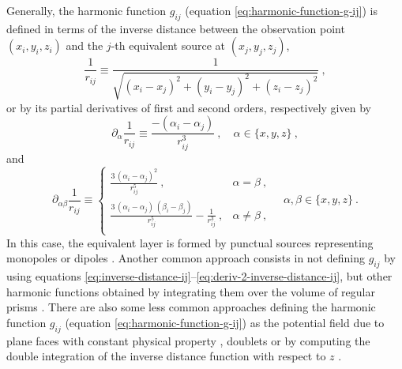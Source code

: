 Generally, the harmonic function $g_{ij}$ (equation \ref{eq:harmonic-function-g-ij}) is defined in terms of the 
inverse distance between the observation point $(x_{i}, y_{i}, z_{i})$ and the $j$-th equivalent source at $(x_{j}, y_{j}, z_{j})$,
\begin{equation}
	\frac{1}{r_{ij}} \equiv \frac{1}{\sqrt{(x_{i} - x_{j})^{2} + (y_{i} - y_{j})^{2} + (z_{i} - z_{j})^{2}}} \: ,
	\label{eq:inverse-distance-ij}
\end{equation}
or by its partial derivatives of first and second orders, respectively given by
\begin{equation}
	\partial_{\alpha} \frac{1}{r_{ij}} \equiv \frac{-(\alpha_{i} - \alpha_{j})}{r_{ij}^{3}} \: ,
	\quad \alpha \in \{ x, y, z \} \: ,
	\label{eq:deriv-1-inverse-distance-ij}
\end{equation}
and
\begin{equation}
	\partial_{\alpha\beta} \frac{1}{r_{ij}} \equiv 
	\begin{cases}
		\frac{3 \, (\alpha_{i} - \alpha_{j})^{2}}{r_{ij}^{5}} \: , &\alpha = \beta \: , \\
		\frac{3 \, (\alpha_{i} - \alpha_{j}) \, (\beta_{i} - \beta_{j})}{r_{ij}^{5}} - \frac{1}{r_{ij}^{3}} \: , &\alpha \ne \beta \: , \\
	\end{cases}
	\quad \alpha, \beta \in \{ x, y, z \} \: .
	\label{eq:deriv-2-inverse-distance-ij}
\end{equation}
In this case, the equivalent layer is formed by punctual sources representing monopoles or dipoles
\cite[e.g.,][]{dampney1969, emilia1973, leao-silva1989, cordell1992, oliveirajr-etal2013, siqueira-etal2017, reis-etal2020, takahashi-etal2020, soler-uieda2021, takahashi-etal2022}.
Another common approach consists in not defining $g_{ij}$ by using equations \ref{eq:inverse-distance-ij}--\ref{eq:deriv-2-inverse-distance-ij},
but other harmonic functions obtained by integrating them over the volume of regular prisms 
\cite[e.g.,][]{li-oldenburg2010, barnes-lumley2011, li_etal_2014, jirigalatu-ebbing2019}.
There are also some less common approaches defining the harmonic function $g_{ij}$ (equation \ref{eq:harmonic-function-g-ij})
as the potential field due to plane faces with constant physical property \citep{hansen-miyazaki1984}, doublets \citep{silva1986} or
by computing the double integration of the inverse distance function with respect to $z$ \citep{guspi-novara2009}.

